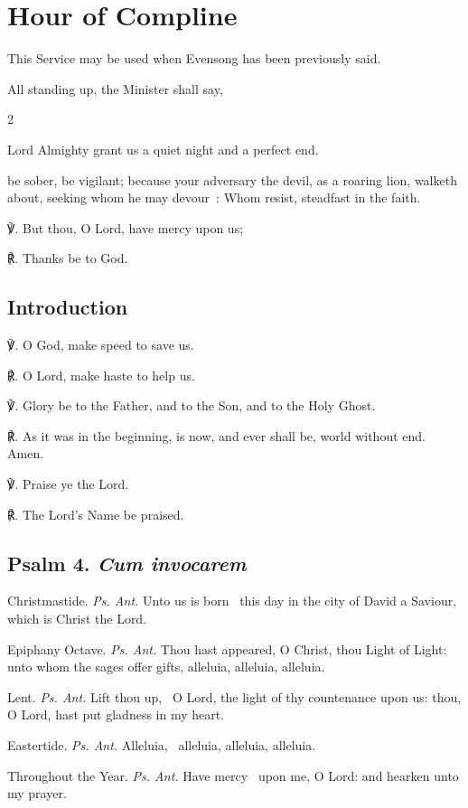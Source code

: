 \fancyhead[RE,LO]{}
\section{Hour of Compline}
\begin{secrubric}
This Service may be used when Evensong has been previously said.
\end{secrubric}
\begin{secrubric}
    All standing up, the Minister shall say,
\end{secrubric}

\begin{multicols}{2}
	
 Lord Almighty grant us a quiet night and a perfect end.\par
{}

 be sober, be vigilant; because your adversary the devil, as a roaring lion, walketh about, seeking whom he may devour~: Whom resist, steadfast in the faith.

℣. But thou, O Lord, have mercy upon us;

℟. Thanks be to God.

\subsection{Introduction}
℣. O God, {} make speed to save us.

℟. O Lord, make haste to help us.

℣. Glory be to the Father, and to the Son, and to the Holy Ghost.

℟. As it was in the beginning, is now, and ever shall be, world without end. Amen.

℣. Praise ye the Lord.

℟. The Lord's Name be praised.

\subsection{Psalm 4. \textit{Cum invocarem}}
\par\noindent
{\color{RubricRed}Christmastide.} \textit{Ps. Ant.} Unto us is born~{\dag} this day in the city of David a Saviour, which is Christ the Lord.%
\par\noindent
{\color{RubricRed}Epiphany Octave.} \textit{Ps. Ant.} Thou hast appeared, O Christ, thou Light of Light:~{\dag} unto whom the sages offer gifts, alleluia, alleluia, alleluia.%
\par\noindent
{\color{RubricRed}Lent.} \textit{Ps. Ant.} Lift thou up,~{\dag} O Lord, the light of thy countenance upon us: thou, O Lord, hast put gladness in my heart.%
\par\noindent
{\color{RubricRed}Eastertide.} \textit{Ps. Ant.} Alleluia,~{\dag} alleluia, alleluia, alleluia.
\par\noindent
{\color{RubricRed}Throughout the Year.} \textit{Ps. Ant.} Have mercy~{\dag} upon me, O Lord: and hearken unto my prayer.\\


\end{multicols}
